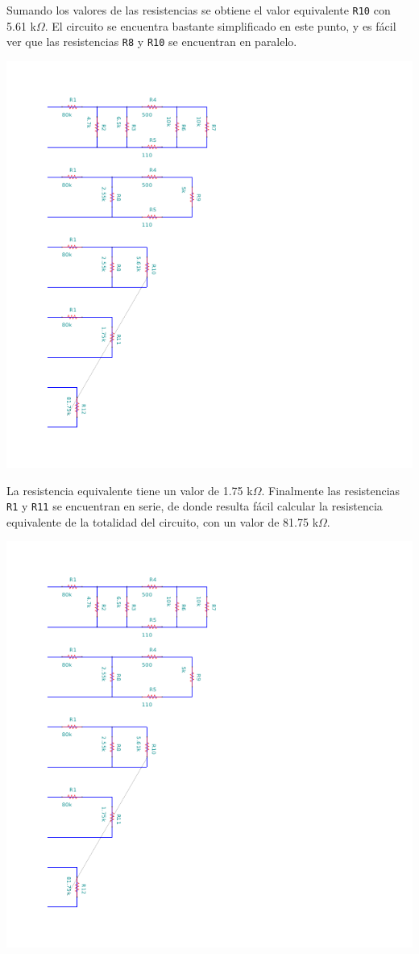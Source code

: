 \documentclass[12pt]{article}
\begin{document}
Sumando los valores de las resistencias se obtiene el valor equivalente \verb|R10| con 5.61 k$\Omega$. El circuito se encuentra bastante simplificado en este punto, y es f\'acil ver que las resistencias \verb|R8| y \verb|R10| se encuentran en paralelo.
\begin{center}
	\includegraphics[scale=2]{Circuito4.pdf}
\end{center}

La resistencia equivalente tiene un valor de 1.75 k$\Omega$. Finalmente las resistencias \verb|R1| y \verb|R11| se encuentran en serie, de donde resulta f\'acil calcular la resistencia equivalente de la totalidad del circuito, con un valor de 81.75 k$\Omega$.
\begin{center}
	\includegraphics[scale=1.5]{Circuito5.pdf}
\end{center}
\end{document}
